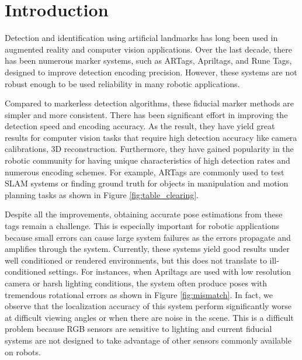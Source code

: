 \section{Introduction}
\label{sec:intro}
Detection and identification using artificial landmarks has long been used in augmented reality and computer vision applications. Over the last decade, there has been numerous marker systems, such as ARTags, Apriltags, and Rune Tags, designed to improve detection encoding precision. However, these systems are not robust enough to be used reliability in many robotic applications.

Compared to markerless detection algorithms, these fiducial marker methods are simpler and more consistent. There has been significant effort in improving the detection speed and encoding accuracy. As the result, they have yield great results for computer vision tasks that require high detection accuracy like camera calibrations, 3D reconstruction. Furthermore, they have gained popularity in the robotic community for having unique characteristics of high detection rates and numerous encoding schemes. For example, ARTags are commonly used to test SLAM systems or finding ground truth for objects in manipulation and motion planning tasks as shown in Figure \ref{fig:table_clearing}. 

Despite all the improvements, obtaining accurate pose estimations from these tags remain a challenge. This is especially important for robotic applications because small errors can cause large system failures as the errors propagate and amplifies through the system. Currently, these systems yield good results under well conditioned or rendered environments, but this does not translate to ill-conditioned settings. For instances, when Apriltags are used with low resolution camera or harsh lighting conditions, the system often produce poses with tremendous rotational errors as shown in Figure \ref{fig:mismatch}. In fact, we observe that the localization accuracy of this system perform significantly worse at difficult viewing angles or when there are noise in the scene. This is a difficult problem because RGB sensors are sensitive to lighting and current fiducial systems are not designed to take advantage of other sensors commonly available on robots.

